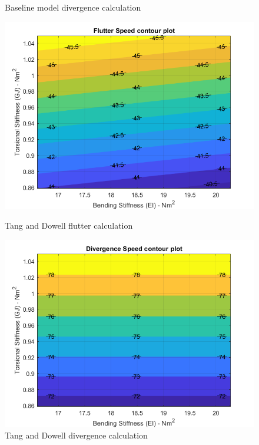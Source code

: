 \documentclass[11pt]{article}
\begin{document}
\begin{figure}[!hbt]
\begin{minipage}{.5\textwidth}
    \caption{Baseline model divergence calculation}
    \label{fig:JandJ-div}
    \end{minipage}
\end{figure}
\begin{figure}[!hbt]
    \begin{minipage}{.5\textwidth}
    \centering
    \includegraphics[width = \textwidth]{figures/flutter.png}
    \caption{Tang and Dowell flutter calculation}
    \label{fig:TandD-flutter}
    \end{minipage}%
    \begin{minipage}{.5\textwidth}
    \centering
    \includegraphics[width = \textwidth]{figures/divergence.png}
    \caption{Tang and Dowell divergence calculation}
    \label{fig:TandD-div}
    \end{minipage}
\end{figure}
\end{document}
